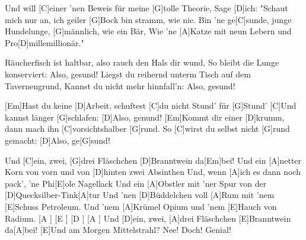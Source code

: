 \begin{guitar}
	\vspace{-0.2em}
	Und will [C]einer 'nen Beweis für meine [G]tolle Theorie,
	Sage [D]ich: "Schaut mich nur an, ich geiler [G]Bock bin stramm, wie nie.
	Bin 'ne ge[C]sunde, junge Hundelunge, [G]männlich, wie ein Bär,
	Wie 'ne [A]Katze mit neun Lebern und Pro[D]millemillionär."
	
	Räucherfisch ist haltbar, also rauch den Hals dir wund,
	So bleibt die Lunge konserviert: Also, gesund!
	Liegst du reihernd unterm Tisch auf dem Tavernengrund,
	Kannst du nicht mehr hinnfall'n: Also, gesund!
	
	[Em]Hast du keine [D]Arbeit, schuftest [C]du nicht Stund' für [G]Stund'
	[C]Und kannst länger [G]schlafen: [D]Also, genund!
	[Em]Kommt dir einer [D]krumm, dann mach ihn [C]vorsichtshalber [G]rund.
	So [C]wirst du selbst nicht [G]rund gemacht: [D]Also, ge[G]sund!
	
	Und [C]ein, zwei, [G]drei Fläschchen [D]Branntwein da[Em]bei!
	Und ein [A]netter Korn von vorn und von [D]hinten zwei Absinthen
	Und, wenn [A]ich es dann noch pack', 'ne Phi[E]ole Nagellack
	Und ein [A]Obstler mit 'ner Spur von der [D]Quecksilber-Tink[A]tur
	Und 'nen [D]Büddelchen voll [A]Rum mit 'nem [E]Schuss Petroleum.
	Und 'nem [A]Krümel Opium und 'nem [E]Hauch von Radium.
	[A ] [E ] [D ] [A ] Und [D]ein, zwei, [A]drei Fläschchen [E]Branntwein da[A]bei!
	[E]Und am Morgen Mittelstrahl? Nee! Doch! Genial!
	
\end{guitar}